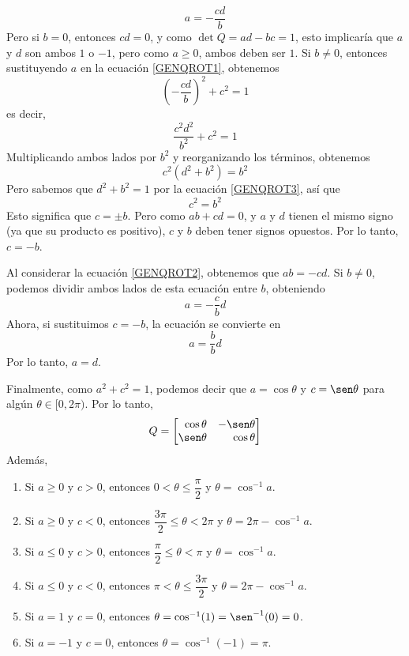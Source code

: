 $$a = -\dfrac{cd}{b}$$
Pero si $b = 0$, entonces $cd = 0$, y como $\operatorname{det} Q = ad - bc = 1$, esto implicaría que $a$ y $d$ son ambos $1$ o $-1$, pero como $a \geq 0$, ambos deben ser $1$. Si $b \neq 0$, entonces sustituyendo $a$ en la ecuación \eqref{GENQROT1}, obtenemos
$$\left(-\frac{cd}{b}\right)^2 + c^2 = 1$$\newpage\noindent
es decir,
$$\frac{c^2d^2}{b^2} + c^2 = 1$$
Multiplicando ambos lados por $b^2$ y reorganizando los términos, obtenemos
$$c^2(d^2 + b^2) = b^2$$
Pero sabemos que $d^2 + b^2 = 1$ por la ecuación \eqref{GENQROT3}, así que
$$c^2 = b^2$$
Esto significa que $c = \pm b$. Pero como $ab + cd = 0$, y $a$ y $d$ tienen el mismo signo (ya que su producto es positivo), $c$ y $b$ deben tener signos opuestos. Por lo tanto, $c = -b$.

Al considerar la ecuación \eqref{GENQROT2}, obtenemos que $ab = -cd$. Si $b \neq 0$, podemos dividir ambos lados de esta ecuación entre $b$, obteniendo
$$a = -\frac{c}{b}d$$
Ahora, si sustituimos $c = -b$, la ecuación se convierte en
$$a = \frac{b}{b}d$$
Por lo tanto, $a = d$.

Finalmente, como $a^2 + c^2 = 1$, podemos decir que $a = \cos \theta$ y $c = \sen \theta$ para algún $\theta \in [0, 2\pi)$. Por lo tanto,
$$Q = \begin{bmatrix*}[r] \cos \theta & - \sen \theta \\ \sen \theta & \cos \theta \end{bmatrix*}$$
Además,
\begin{enumerate}[label=\roman*)]
    \item Si $a \geq 0$ y $c > 0$, entonces $0 < \theta \leq \dfrac{\pi}{2}$ y $\theta = \cos^{-1} a$.
    \item Si $a \geq 0$ y $c < 0$, entonces $\dfrac{3\pi}{2} \leq \theta < 2\pi$ y $\theta = 2\pi - \cos^{-1} a$.
    \item Si $a \leq 0$ y $c > 0$, entonces $\dfrac{\pi}{2} \leq \theta < \pi$ y $\theta = \cos^{-1} a$.
    \item Si $a \leq 0$ y $c < 0$, entonces $\pi < \theta \leq \dfrac{3\pi}{2}$ y $\theta = 2\pi - \cos^{-1} a$.
    \item Si $a = 1$ y $c = 0$, entonces $\theta = \cos^{-1} (1) = \sen^{-1} (0) = 0$.
    \item Si $a = -1$ y $c = 0$, entonces $\theta = \cos^{-1} (-1) = \pi$.
\end{enumerate}

